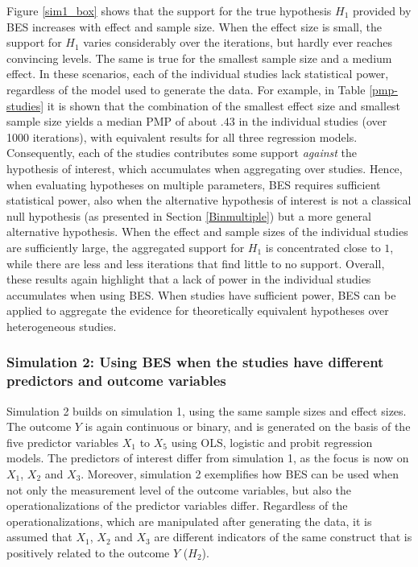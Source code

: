 \documentclass[11pt,reqno]{article}
\begin{document}
Figure \ref{sim1_box} shows that the support for the true hypothesis $H_1$ provided by BES increases with effect and sample size.
When the effect size is small, the support for $H_1$ varies considerably over the iterations, but hardly ever reaches convincing levels.
The same is true for the smallest sample size and a medium effect.
In these scenarios, each of the individual studies lack statistical power, regardless of the model used to generate the data.
For example, in Table \ref{pmp-studies} it is shown that the combination of the smallest effect size and smallest sample size yields a median PMP of about $.43$ in the individual studies (over 1000 iterations), with equivalent results for all three regression models.
Consequently, each of the studies contributes some support \textit{against} the hypothesis of interest, which accumulates when aggregating over studies.
Hence, when evaluating hypotheses on multiple parameters, BES requires sufficient statistical power, also when the alternative hypothesis of interest is not a classical null hypothesis (as presented in Section \ref{Binmultiple}) but a more general alternative hypothesis.
When the effect and sample sizes of the individual studies are sufficiently large, the aggregated support for $H_1$ is concentrated close to $1$, while there are less and less iterations that find little to no support.
Overall, these results again highlight that a lack of power in the individual studies accumulates when using BES.
When studies have sufficient power, BES can be applied to aggregate the evidence for theoretically equivalent hypotheses over heterogeneous studies.


\subsubsection{Simulation 2: Using BES when the studies have different predictors and outcome variables}

Simulation 2 builds on simulation 1, using the same sample sizes and effect sizes.
The outcome $Y$ is again continuous or binary, and is generated on the basis of the five predictor variables $X_1$ to $X_5$ using OLS, logistic and probit regression models.
The predictors of interest differ from simulation 1, as the focus is now on $X_1$, $X_2$ and $X_3$.
Moreover, simulation 2 exemplifies how BES can be used when not only the measurement level of the outcome variables, but also the operationalizations of the predictor variables differ.
Regardless of the operationalizations, which are manipulated after generating the data, it is assumed that $X_1$, $X_2$ and $X_3$ are different indicators of the same construct that is positively related to the outcome $Y$ ($H_2$).
\end{document}
